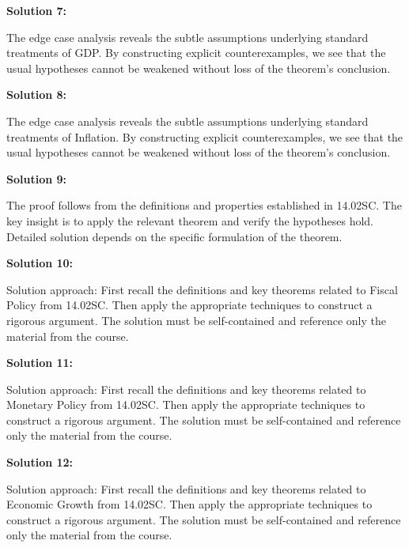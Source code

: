 \documentclass[12pt,a4paper]{exam}
\begin{document}
\vspace{0.5cm}

\textbf{Solution 7:}

The edge case analysis reveals the subtle assumptions underlying standard treatments of GDP. By constructing explicit counterexamples, we see that the usual hypotheses cannot be weakened without loss of the theorem's conclusion.

\vspace{0.5cm}

\textbf{Solution 8:}

The edge case analysis reveals the subtle assumptions underlying standard treatments of Inflation. By constructing explicit counterexamples, we see that the usual hypotheses cannot be weakened without loss of the theorem's conclusion.

\vspace{0.5cm}

\textbf{Solution 9:}

The proof follows from the definitions and properties established in 14.02SC. The key insight is to apply the relevant theorem and verify the hypotheses hold. Detailed solution depends on the specific formulation of the theorem.

\vspace{0.5cm}

\textbf{Solution 10:}

Solution approach: First recall the definitions and key theorems related to Fiscal Policy from 14.02SC. Then apply the appropriate techniques to construct a rigorous argument. The solution must be self-contained and reference only the material from the course.

\vspace{0.5cm}

\textbf{Solution 11:}

Solution approach: First recall the definitions and key theorems related to Monetary Policy from 14.02SC. Then apply the appropriate techniques to construct a rigorous argument. The solution must be self-contained and reference only the material from the course.

\vspace{0.5cm}

\textbf{Solution 12:}

Solution approach: First recall the definitions and key theorems related to Economic Growth from 14.02SC. Then apply the appropriate techniques to construct a rigorous argument. The solution must be self-contained and reference only the material from the course.
\end{document}
